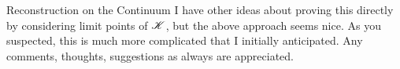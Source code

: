 \begin{chapter}{Reconstruction on the Continuum}
I have other ideas about proving this directly by considering limit points of $\mathscr K$, but the above approach seems nice.
As you suspected, this is much more complicated that I initially anticipated.
Any comments, thoughts, suggestions as always are appreciated.


%

\end{chapter}

